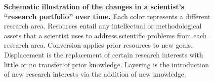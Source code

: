 \documentclass{article}
\begin{document}
\begin{figure}[h]

    \caption{\textbf{Schematic illustration of the changes in a scientist's ``research portfolio'' over time.} Each color represents a different research area. Resources entail any intellectual or methodological assets that a scientist uses to address scientific problems from each research area. Conversion applies prior resources to new goals. Displacement is the replacement of certain research interests with little or no transfer of prior knowledge. Layering is the introduction of new research interests via the addition of new knowledge.}
    \label{fig:research-agenda}
\end{figure}
\end{document}
